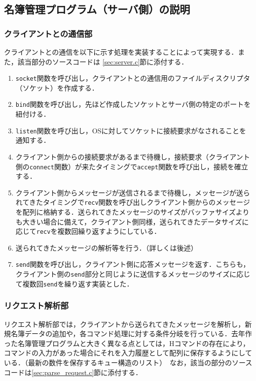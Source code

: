 \documentclass[11pt]{jsarticle}
\begin{document}
\subsection{名簿管理プログラム（サーバ側）の説明}

\subsubsection{クライアントとの通信部}

クライアントとの通信を以下に示す処理を実装することによって実現する．また，該当部分のソースコードは \ref{sec:server.c}節に添付する．

\begin{enumerate}
      \item {\tt socket}関数を呼び出し，クライアントとの通信用のファイルディスクリプタ（ソケット）を作成する．
      \item {\tt bind}関数を呼び出し，先ほど作成したソケットとサーバ側の特定のポートを紐付ける．
      \item {\tt listen}関数を呼び出し，OSに対してソケットに接続要求がなされることを通知する．
      \item クライアント側からの接続要求があるまで待機し，接続要求（クライアント側の{\tt connect}関数）が来たタイミングで{\tt accept}関数を呼び出し，接続を確立する．
      \item クライアント側からメッセージが送信されるまで待機し，メッセージが送られてきたタイミングで{\tt recv}関数を呼び出しクライアント側からのメッセージを配列に格納する．送られてきたメッセージのサイズがバッファサイズよりも大きい場合に備えて，クライアント側同様，送られてきたデータサイズに応じて{\tt recv}を複数回繰り返すようにしている．
      \item 送られてきたメッセージの解析等を行う．（詳しくは後述）
      \item {\tt send}関数を呼び出し，クライアント側に応答メッセージを返す．こちらも，クライアント側の{\tt send}部分と同じように送信するメッセージのサイズに応じて複数回{\tt send}を繰り返す実装とした．
\end{enumerate}

\subsubsection{リクエスト解析部}

リクエスト解析部では，クライアントから送られてきたメッセージを解析し，新規名簿データの追加や，各コマンド処理に対する条件分岐を行っている．去年作った名簿管理プログラムと大きく異なる点としては，Hコマンドの存在により，コマンドの入力があった場合にそれを入力履歴として配列に保存するようにしている．（最新の数件を保存するキュー構造のリスト）　なお，該当の部分のソースコードは\ref{sec:parse_request.c}節に添付する．
\end{document}
